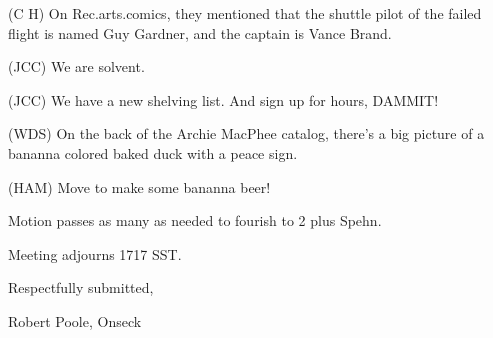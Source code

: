 (C H) On Rec.arts.comics, they mentioned that the shuttle pilot of the failed
flight is named Guy Gardner, and the captain is Vance Brand.

(JCC) We are solvent.

(JCC) We have a new shelving list.  And sign up for hours, DAMMIT!

(WDS) On the back of the Archie MacPhee catalog, there's a big picture of a
bananna colored baked duck with a peace sign.

(HAM) Move to make some bananna beer!

Motion passes as many as needed to fourish to 2 plus Spehn.

Meeting adjourns 1717 SST.

\vspace{0.15in}
\begin{center}
Respectfully submitted,

Robert Poole, Onseck
\end{center}

